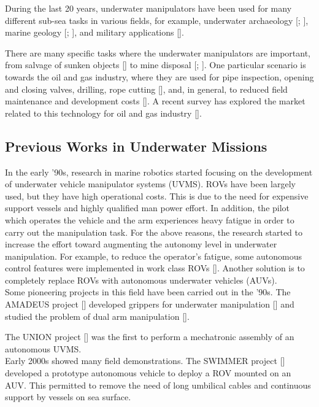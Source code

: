 During the last 20 years, underwater manipulators have been used for many different sub-sea tasks in various fields, for example, underwater archaeology [\cite{IntroApp4}; \cite{IntroApp3}], marine geology [\cite{IntroApp1}; \cite{IntroApp2}], and military applications [\cite{IntroApp5}].

There are many specific tasks where the underwater manipulators are important, from salvage of sunken objects [\cite{IntroSpecApp1}] to mine disposal [\cite{IntroSpecApp2}; \cite{IntroSpecApp3}]. One particular scenario is towards the oil and gas industry, where they are used for pipe inspection, opening and closing valves, drilling, rope cutting [\cite{IntroSpecApp4}], and, in general, to reduced field maintenance and development costs [\cite{IntroSpecApp5}]. A recent survey has explored the market related to this technology for oil and gas industry [\cite{IntroSpecApp6}].

\subsection{Previous Works in Underwater Missions}
In the early '90s, research in marine robotics started focusing on the development of underwater vehicle manipulator systems (UVMS). ROVs have been largely used, but they have high operational costs. This is due to the need for expensive support vessels and highly qualified man power effort. In addition, the pilot which operates the vehicle and the arm experiences heavy fatigue in order to carry out the manipulation task. For the above reasons, the research started to increase the effort toward augmenting the autonomy level in underwater manipulation. For example, to reduce the operator's fatigue, some autonomous control features were implemented in work class ROVs [\cite{IntroTeleopRov}]. Another solution is to completely replace ROVs with autonomous underwater vehicles (AUVs).\\

Some pioneering projects in this field have been carried out in the '90s. The AMADEUS project [\cite{IntroAMADEUS1}] developed grippers for underwater manipulation [\cite{IntroAMADEUS2}] and studied the problem of dual arm manipulation [\cite{IntroAMADEUS3}].

The UNION project [\cite{IntroUNION}] was the first to perform a mechatronic assembly of an autonomous UVMS.\\


Early 2000s showed many field demonstrations. The SWIMMER project [\cite{IntroSwimmer1}] developed a prototype autonomous vehicle to deploy a ROV mounted on an AUV. This permitted to remove the need of long umbilical cables and continuous support by vessels on sea surface.

